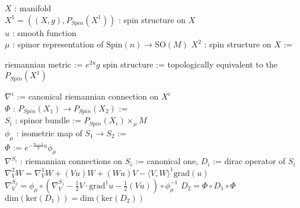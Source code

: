 \begin{Theorem}
\itemwhen
  \Fix \(X\) : manifold \\
  \Fix \(X^1 = ((X , g) , P_{Spin}(X^1))\) : spin structure on \(X\) \\
  \Fix \(u\) : smooth function \\
  \Fix \(\mu\) : spinor representation of \(\text{Spin}(n) \to \text{SO}(M)\)
\itemwhen
  \Let \(X^2\) : spin structure on \(X\) :=
  \begin{itemize}
    \itemenum riemannian metric := \(e^{2u}g\)
    \itemenum spin structure := topologically equivalent to the \(P_{Spin}(X^1)\)
  \end{itemize}
  \Let \(\nabla^i\) := canonical riemannian connection on \(X^i\) \\
  \Let \(\Phi\) : \(P_{Spin}(X_1) \to P_{Spin}(X_2)\) :=  \\
  \Let \(S_i\) : spinor bundle := \(P_{Spin}(X_i) \times_{\mu} M\) \\
  \Let \(\phi_{\mu}\) : isometric map of \(S_1 \to S_2\) :=  \\
  \Let \(\varPhi\) := \(e^{- \frac{n-1}{2} u} \phi_{\mu}\) \\
  \Let \(\nabla^{S_i}\) : riemannian connections on \(S_i\) := canonical one, \(D_i\) := dirac operator of \(S_i\) \\
\itemprop
  \(\nabla^2_V W = \nabla^1_V W + (V u) W + (W u) V - \langle V , W \rangle^1 \text{grad}(u)\)
\itemprop
  \(\nabla^{S_2}_V = \phi_{\mu} \circ (\nabla^{S_1}_V - \frac{1}{2} V \cdot \text{grad}^1 u - \frac{1}{2} (V u)) \circ \phi_{\mu}^{-1}\)
\itemprop
  \(D_2 = \varPhi \circ D_1 \circ \varPhi\)
\itemprop
  \(\text{dim}(\text{ker}(D_1)) = \text{dim}(\text{ker}(D_2))\)
\end{Theorem}

